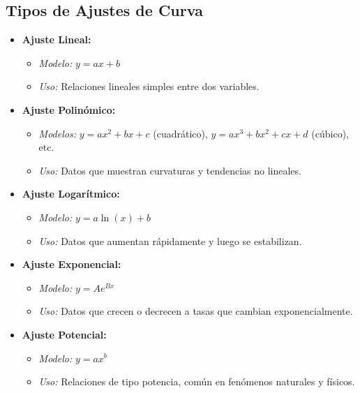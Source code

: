 \subsection{Tipos de Ajustes de Curva}

\begin{itemize}
    \item \textbf{Ajuste Lineal:}
    \begin{itemize}
        \item \textit{Modelo:} \( y = ax + b \)
        \item \textit{Uso:} Relaciones lineales simples entre dos variables.
    \end{itemize}

    \item \textbf{Ajuste Polinómico:}
    \begin{itemize}
        \item \textit{Modelos:} \( y = ax^2 + bx + c \) (cuadrático), \( y = ax^3 + bx^2 + cx + d \) (cúbico), etc.
        \item \textit{Uso:} Datos que muestran curvaturas y tendencias no lineales.
    \end{itemize}

    \item \textbf{Ajuste Logarítmico:}
    \begin{itemize}
        \item \textit{Modelo:} \( y = a \ln(x) + b \)
        \item \textit{Uso:} Datos que aumentan rápidamente y luego se estabilizan.
    \end{itemize}

    \item \textbf{Ajuste Exponencial:}
    \begin{itemize}
        \item \textit{Modelo:} \( y = Ae^{Bx} \)
        \item \textit{Uso:} Datos que crecen o decrecen a tasas que cambian exponencialmente.
    \end{itemize}

    \item \textbf{Ajuste Potencial:}
    \begin{itemize}
        \item \textit{Modelo:} \( y = ax^b \)
        \item \textit{Uso:} Relaciones de tipo potencia, común en fenómenos naturales y físicos.
    \end{itemize}

\end{itemize}

